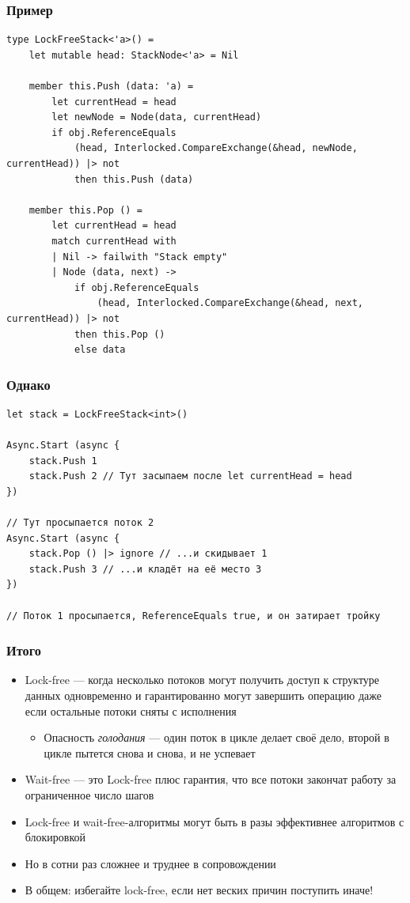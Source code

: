 \documentclass{../../slides-style}
\begin{document}
    \begin{frame}[fragile]
        \frametitle{Пример}
        \begin{footnotesize}
            \begin{verbatim}
type LockFreeStack<'a>() =
    let mutable head: StackNode<'a> = Nil
    
    member this.Push (data: 'a) =
        let currentHead = head
        let newNode = Node(data, currentHead)
        if obj.ReferenceEquals
            (head, Interlocked.CompareExchange(&head, newNode, currentHead)) |> not 
            then this.Push (data)

    member this.Pop () =
        let currentHead = head
        match currentHead with
        | Nil -> failwith "Stack empty"
        | Node (data, next) ->
            if obj.ReferenceEquals
                (head, Interlocked.CompareExchange(&head, next, currentHead)) |> not 
            then this.Pop ()
            else data
            \end{verbatim}
        \end{footnotesize}
    \end{frame}

    \begin{frame}[fragile]
        \frametitle{Однако}
        \begin{verbatim}
let stack = LockFreeStack<int>()

Async.Start (async { 
    stack.Push 1
    stack.Push 2 // Тут засыпаем после let currentHead = head
})

// Тут просыпается поток 2
Async.Start (async { 
    stack.Pop () |> ignore // ...и скидывает 1
    stack.Push 3 // ...и кладёт на её место 3
})

// Поток 1 просыпается, ReferenceEquals true, и он затирает тройку
        \end{verbatim}
    \end{frame}

    \begin{frame}
        \frametitle{Итого}
        \begin{itemize}
            \item Lock-free --- когда несколько потоков могут получить доступ к структуре данных одновременно и гарантированно могут завершить операцию даже если остальные потоки сняты с исполнения
            \begin{itemize}
                \item Опасность \textit{голодания} --- один поток в цикле делает своё дело, второй в цикле пытется снова и снова, и не успевает
            \end{itemize}
            \item Wait-free --- это Lock-free плюс гарантия, что все потоки закончат работу за ограниченное число шагов
            \item Lock-free и wait-free-алгоритмы могут быть в разы эффективнее алгоритмов с блокировкой
            \item Но в сотни раз сложнее и труднее в сопровождении
            \item В общем: избегайте lock-free, если нет веских причин поступить иначе!
        \end{itemize}
    \end{frame}
\end{document}
